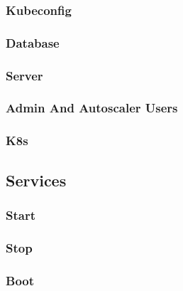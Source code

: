 \subsubsection{Kubeconfig}
\label{subsubsec:implementation_installer_cluster_initialization_kubeconfig}


\subsubsection{Database}
\label{subsubsec:implementation_installer_cluster_initialization_database}

\subsubsection{Server}
\label{subsubsec:implementation_installer_cluster_initialization_server}

\subsubsection{Admin And Autoscaler Users}
\label{subsubsec:implementation_installer_cluster_initialization_admin_and_autoscaler_users}

\subsubsection{K8s}
\label{subsubsec:implementation_installer_cluster_initialization_k8s}

\subsection{Services}
\label{subsec:implementation_installer_services}

\subsubsection{Start}
\label{subsubsec:implementation_installer_services_start}

\subsubsection{Stop}
\label{subsubsec:implementation_installer_services_stop}

\subsubsection{Boot}
\label{subsubsec:implementation_installer_services_boot}

